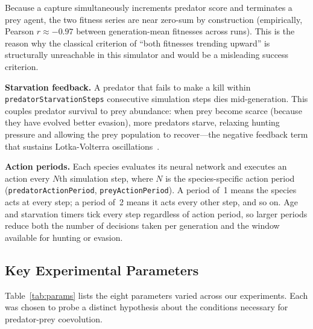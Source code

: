 \documentclass[11pt]{article}
\begin{document}
Because a capture simultaneously increments predator score and terminates a prey agent, the
two fitness series are near zero-sum by construction (empirically, Pearson $r \approx -0.97$
between generation-mean fitnesses across runs).
This is the reason why the classical criterion of ``both fitnesses trending upward'' is
structurally unreachable in this simulator and would be a misleading success criterion.

\textbf{Starvation feedback.}
A predator that fails to make a kill within \texttt{predatorStarvationSteps} consecutive
simulation steps dies mid-generation.
This couples predator survival to prey abundance: when prey become scarce (because they have
evolved better evasion), more predators starve, relaxing hunting pressure and allowing the prey
population to recover—the negative feedback term that sustains Lotka-Volterra
oscillations~\cite{lotka1925,volterra1926}.

\textbf{Action periods.}
Each species evaluates its neural network and executes an action every $N$th simulation step,
where $N$ is the species-specific action period (\texttt{predatorActionPeriod},
\texttt{preyActionPeriod}).
A period of~1 means the species acts at every step; a period of~2 means it acts every other
step, and so on.
Age and starvation timers tick every step regardless of action period, so larger periods reduce
both the number of decisions taken per generation and the window available for hunting or
evasion.

\subsection{Key Experimental Parameters}

Table~\ref{tab:params} lists the eight parameters varied across our experiments.
Each was chosen to probe a distinct hypothesis about the conditions necessary for
predator-prey coevolution.
\end{document}
